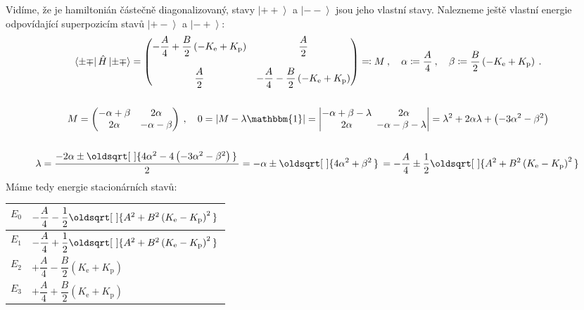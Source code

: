 \documentclass[10pt,a4paper]{article}
\renewcommand*{\sqrt}[2][\ ]{\oldsqrt[#1]{#2\,}\,}
\newcommand{\const}[1]{\text{#1}}
\newcommand{\mat}[1]{
    \begin{pmatrix}
        #1
    \end{pmatrix}
}
\newcommand{\bra}[1]{\left< #1 \right|}
\newcommand{\ket}[1]{\left| #1 \right>}
\def\1{\mathbbm{1}}
\begin{document}
Vidíme, že je hamiltonián částečně diagonalizovaný, stavy $\ket{++}$ a $\ket{--}$ jsou jeho vlastní stavy. Nalezneme ještě vlastní energie odpovídající superpozicím stavů $\ket{+-}$ a $\ket{-+}$:
\begin{gather*}
    \bra{\pm\mp} \hat H \ket{\pm\mp}
    = \mat{
        -\dfrac{A}{4} + \dfrac{B}{2}\left(-K_\const{e} + K_\const{p}\right) & \dfrac{A}{2} \\[15pt]
        \dfrac{A}{2} & -\dfrac{A}{4} - \dfrac{B}{2}\left(-K_\const{e} + K_\const{p}\right)
    } \eqqcolon M
    \: , \quad
    \alpha \coloneqq \frac{A}{4}
    \: , \quad
    \beta \coloneqq \frac{B}{2}\left(-K_\const{e} + K_\const{p}\right)
    \: .
    \\\\
    M = \mat{
        -\alpha + \beta & 2\alpha \\
        2\alpha & -\alpha - \beta
    }
    \: , \quad
    0 =
    \left| M - \lambda \1 \right| = \begin{vmatrix}
        -\alpha + \beta - \lambda & 2\alpha \\
        2\alpha & \!\!\! -\alpha - \beta - \lambda
    \end{vmatrix}
    = \lambda^2 + 2\alpha\lambda + \left(-3\alpha^2 - \beta^2\right)
    \\\\
    \lambda
    = \frac{-2\alpha \pm \sqrt{4\alpha^2 - 4\left(-3\alpha^2 - \beta^2\right)}}{2}
    = -\alpha \pm \sqrt{4\alpha^2 + \beta^2}
    = -\frac{A}{4} \pm \frac{1}{2} \sqrt{A^2 + B^2 \left(K_\const{e} - K_\const{p}\right)^2}
\end{gather*}
Máme tedy energie stacionárních stavů:
\begin{table}[h!]
    \centering
    \begin{tabular}{ r|l }
        $E_0$ &
        $-\dfrac{A}{4} - \dfrac{1}{2} \sqrt{A^2 + B^2 \left(K_\const{e} - K_\const{p}\right)^2}$
        \\[10pt]\hline
        \rule{0pt}{1.5\normalbaselineskip}
        $E_1$ &
        $-\dfrac{A}{4} + \dfrac{1}{2} \sqrt{A^2 + B^2 \left(K_\const{e} - K_\const{p}\right)^2}$
        \\[10pt]\hline
        \rule{0pt}{1.5\normalbaselineskip}
        $E_2$ &
        $+\dfrac{A}{4} - \dfrac{B}{2} \left( K_\const{e} + K_\const{p}\right)$
        \\[10pt]\hline
        \rule{0pt}{1.5\normalbaselineskip}
        $E_3$ &
        $+\dfrac{A}{4} + \dfrac{B}{2} \left( K_\const{e} + K_\const{p}\right)$
    \end{tabular}
\end{table}
\end{document}
